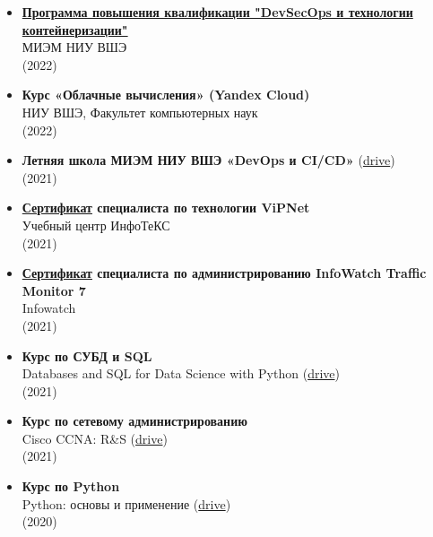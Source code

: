 \documentclass[12pt, a4paper]{extarticle}
\begin{document}
\begin{itemize}
    \item {\bf \href{https://docs.google.com/document/d/1TC7nxMp90rXYOoCR8xFcSec68fIHsvFjR1trdSvrNIM/edit?usp=sharing}{Программа повышения квалификации "DevSecOps и технологии контейнеризации"}} \\
    МИЭМ НИУ ВШЭ \\
    (2022)
    \item {\bf Курс «Облачные вычисления» (Yandex Cloud)} \\
    НИУ ВШЭ, Факультет компьютерных наук \\
    (2022)
    \item {\bf Летняя школа МИЭМ НИУ ВШЭ «DevOps и CI/CD»} (\href{https://drive.google.com/file/d/1mH_22bA2mgqw43ehw-CvZM6c7_8BLLYm/view?usp=sharing}{drive}) \\
    (2021)
    \item {\bf \href{https://drive.google.com/file/d/1RVzl6slqWSsdnuELYxT9DYE8HfRkd_6O/view?usp=sharing}{Сертификат} специалиста по технологии ViPNet} \\
    Учебный центр ИнфоТеКС \\
    (2021)
    \item {\bf \href{https://drive.google.com/file/d/1F6PAzi25VpJ1SL9G5TVafDHkP2hBAEeB/view}{Сертификат} специалиста по администрированию InfoWatch Traffic Monitor 7} \\
    Infowatch \\
    (2021)
    \item {\bf Курс по СУБД и SQL} \\
    Databases and SQL for Data Science with Python (\href{https://drive.google.com/file/d/1lifQoGFJDSxcjNfwNnR1FiF0MavP9uJL/view?usp=sharing}{drive}) \\
    (2021)
    \item {\bf Курс по сетевому администрированию} \\
    Cisco CCNA: R\&S (\href{https://drive.google.com/file/d/1fBK2Zp-YPH3ahQ8KUEko2ggwCXJ_MYSj/view}{drive}) \\
    (2021)
    \item {\bf Курс по Python} \\
    Python: основы и применение (\href{https://drive.google.com/file/d/1opeiH4ZQKNo-1PUl4RhARUt85vdAHb3L/view?usp=sharing}{drive}) \\
    (2020)
\end{itemize}
\end{document}
